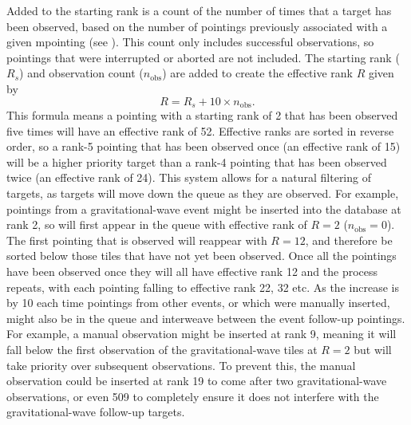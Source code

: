 \begin{colsection}
Added to the starting rank is a count of the number of times that a target has been observed, based on the number of pointings previously associated with a given mpointing (see ). This count only includes successful observations, so pointings that were interrupted or aborted are not included. The starting rank ($R_s$) and observation count ($n_\text{obs}$) are added to create the effective rank $R$ given by
%
\begin{equation}
    R = R_s + 10\times n_\text{obs}.
    \label{eq:effective_rank}
\end{equation}
%
This formula means a pointing with a starting rank of 2 that has been observed five times will have an effective rank of 52. Effective ranks are sorted in reverse order, so a rank-5 pointing that has been observed once (an effective rank of 15) will be a higher priority target than a rank-4 pointing that has been observed twice (an effective rank of 24). This system allows for a natural filtering of targets, as targets will move down the queue as they are observed. For example, pointings from a gravitational-wave event might be inserted into the database at rank 2, so will first appear in the queue with effective rank of $R=2$ ($n_\text{obs}=0$). The first pointing that is observed will reappear with $R=12$, and therefore be sorted below those tiles that have not yet been observed. Once all the pointings have been observed once they will all have effective rank 12 and the process repeats, with each pointing falling to effective rank 22, 32 etc. As the increase is by 10 each time pointings from other events, or which were manually inserted, might also be in the queue and interweave between the event follow-up pointings. For example, a manual observation might be inserted at rank 9, meaning it will fall below the first observation of the gravitational-wave tiles at $R=2$ but will take priority over subsequent observations. To prevent this, the manual observation could be inserted at rank 19 to come after two gravitational-wave observations, or even 509 to completely ensure it does not interfere with the gravitational-wave follow-up targets.

\end{colsection}


